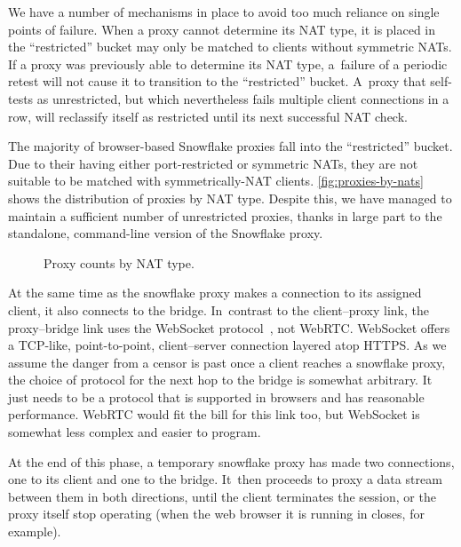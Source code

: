 \documentclass[letterpaper,twocolumn]{article}
\begin{document}
We have a number of
mechanisms in place to avoid too much reliance on single points of failure.
When a proxy cannot determine its NAT type,
it is placed in the ``restricted'' bucket may only be matched to clients without symmetric NATs.
If a proxy was previously able to determine its NAT type,
a~failure of a periodic retest will not cause it to transition to the ``restricted'' bucket.
A~proxy that self-tests as unrestricted,
but which nevertheless fails multiple client connections in a row,
will reclassify itself as restricted
until its next successful NAT check.

The majority of browser-based Snowflake proxies
fall into the ``restricted'' bucket.
Due to their having either port-restricted or symmetric NATs,
they are not suitable to be matched with symmetrically-NAT clients.
\autoref{fig:proxies-by-nats} shows the distribution of proxies by NAT type.
Despite this, we have managed to maintain a sufficient number of unrestricted proxies,
thanks in large part to the standalone, command-line
version of the Snowflake proxy.

\begin{figure}
\caption{Proxy counts by NAT type.}
\label{fig:proxies-by-nats}
\end{figure}

At the same time as the snowflake proxy makes a connection to its assigned client,
it also connects to the bridge.
In~contrast to the client--proxy link,
the proxy--bridge link
uses the WebSocket protocol~\cite{rfc6455}, not WebRTC.
WebSocket offers a TCP-like, point-to-point, client--server connection
layered atop HTTPS.
As we assume the danger from a censor is past
once a client reaches a snowflake proxy,
the choice of protocol for the next hop to the bridge is somewhat arbitrary.
It just needs to be a protocol that is supported in browsers
and has reasonable performance.
WebRTC would fit the bill for this link too,
but WebSocket is somewhat less complex and easier to program.

At the end of this phase,
a temporary snowflake proxy has made two connections,
one to its client and one to the bridge.
It~then proceeds to proxy a data stream between them
in both directions,
until the client terminates the session,
or the proxy itself stop operating
(when the web browser it is running in closes, for example).
\end{document}
